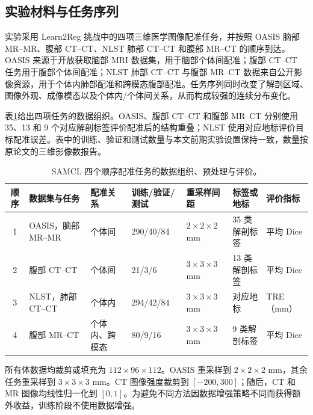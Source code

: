 \subsection{实验材料与任务序列}
\label{subsubsec:samcl-materials}

实验采用 Learn2Reg 挑战中的四项三维医学图像配准任务，并按照 OASIS 脑部 MR--MR、腹部 CT--CT、NLST 肺部 CT--CT 和腹部 MR--CT 的顺序到达\cite{hering2021learn2reg}。OASIS 来源于开放获取脑部 MRI 数据集，用于脑部个体间配准\cite{marcus2007oasis}；腹部 CT--CT 任务用于腹部个体间配准\cite{xu2016abdomenreg}；NLST 肺部 CT--CT 与腹部 MR--CT 数据来自公开影像资源，用于个体内肺部配准和跨模态腹部配准\cite{clark2013tcia,xu2016abdomenreg}。任务序列同时改变了解剖区域、图像外观、成像模态以及个体内/个体间关系，从而构成较强的连续分布变化。

表\ref{tab:samcl-datasets}给出四项任务的数据组织。OASIS、腹部 CT--CT 和腹部 MR--CT 分别使用 35、13 和 9 个对应解剖标签评价配准后的结构重叠；NLST 使用对应地标评价目标配准误差。表中的训练、验证和测试数量与本文前期实验设置保持一致\cite{wang2024samcl}，数量按原论文的三维影像数报告。

\begin{table}[htbp]
\centering
\caption{SAMCL 四个顺序配准任务的数据组织、预处理与评价。}
\label{tab:samcl-datasets}
\thesistablefont
\renewcommand{\arraystretch}{1.14}
\setlength{\tabcolsep}{3pt}
\begin{tabularx}{\textwidth}{@{}cXp{1.8cm}p{2.35cm}p{1.65cm}p{2.0cm}p{1.5cm}@{}}
\toprule
顺序 & 数据集与任务 & 配准关系 & 训练/验证/测试 & 重采样间距 & 标签或地标 & 评价指标 \\
\midrule
1 & OASIS，脑部 MR--MR & 个体间 & 290/40/84 & $2\times2\times2$ mm & 35 类解剖标签 & 平均 Dice \\
2 & 腹部 CT--CT & 个体间 & 21/3/6 & $3\times3\times3$ mm & 13 类解剖标签 & 平均 Dice \\
3 & NLST，肺部 CT--CT & 个体内 & 294/42/84 & $3\times3\times3$ mm & 对应地标 & TRE（mm） \\
4 & 腹部 MR--CT & 个体内、跨模态 & 80/9/16 & $3\times3\times3$ mm & 9 类解剖标签 & 平均 Dice \\
\bottomrule
\end{tabularx}
\end{table}

所有体数据均裁剪或填充为
$112\times96\times112$。OASIS 重采样到
$2\times2\times2$ mm，其余任务重采样到
$3\times3\times3$ mm。CT 图像强度裁剪到
$[-200,300]$；随后，CT 和 MR 图像均线性归一化到 $[0,1]$。为避免不同方法因数据增强策略不同而获得额外收益，训练阶段不使用数据增强。

